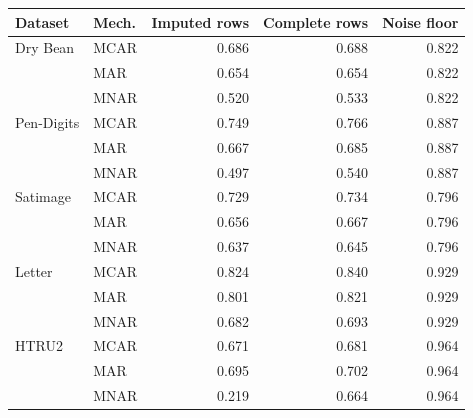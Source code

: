 \begin{tabular}{llrrr}
\toprule
Dataset & Mech. & Imputed rows & Complete rows & Noise floor \\
\midrule
Dry Bean & MCAR & 0.686 & 0.688 & 0.822 \\
 & MAR & 0.654 & 0.654 & 0.822 \\
 & MNAR & 0.520 & 0.533 & 0.822 \\
\midrule
Pen-Digits & MCAR & 0.749 & 0.766 & 0.887 \\
 & MAR & 0.667 & 0.685 & 0.887 \\
 & MNAR & 0.497 & 0.540 & 0.887 \\
\midrule
Satimage & MCAR & 0.729 & 0.734 & 0.796 \\
 & MAR & 0.656 & 0.667 & 0.796 \\
 & MNAR & 0.637 & 0.645 & 0.796 \\
\midrule
Letter & MCAR & 0.824 & 0.840 & 0.929 \\
 & MAR & 0.801 & 0.821 & 0.929 \\
 & MNAR & 0.682 & 0.693 & 0.929 \\
\midrule
HTRU2 & MCAR & 0.671 & 0.681 & 0.964 \\
 & MAR & 0.695 & 0.702 & 0.964 \\
 & MNAR & 0.219 & 0.664 & 0.964 \\
\bottomrule
\end{tabular}